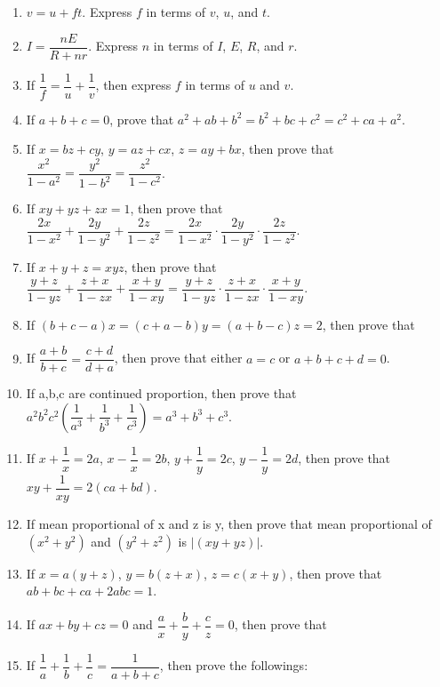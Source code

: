 \begin{enumerate}
            \item $v=u+ft$. Express $f$ in terms of $v$, $u$, and $t$.
            \item $I=\dfrac{nE}{R+nr}$. Express $n$ in terms of $I$, $E$, $R$, and $r$.
            \item If $\dfrac{1}{f}=\dfrac{1}{u}+\dfrac{1}{v}$, then express $f$ in terms of $u$ and $v$.



            \item If $a+b+c=0$, prove that $a^2+ab+b^2=b^2+bc+c^2=c^2+ca+a^2$.
            \item If $x=bz+cy$, $y=az+cx$, $z=ay+bx$, then prove that $\dfrac{x^2}{1-a^2}=\dfrac{y^2}{1-b^2}=\dfrac{z^2}{1-c^2}$.
            \item If $xy+yz+zx=1$, then prove that $\dfrac{2x}{1-x^2}+\dfrac{2y}{1-y^2}+\dfrac{2z}{1-z^2}=\dfrac{2x}{1-x^2}\cdot\dfrac{2y}{1-y^2}\cdot\dfrac{2z}{1-z^2}$.
            \item If $x+y+z=xyz$, then prove that $\dfrac{y+z}{1-yz}+\dfrac{z+x}{1-zx}+\dfrac{x+y}{1-xy}=\dfrac{y+z}{1-yz}\cdot\dfrac{z+x}{1-zx}\cdot\dfrac{x+y}{1-xy}$.
            \item If $(b+c-a)x=(c+a-b)y=(a+b-c)z=2$, then prove that 
            \item If $\dfrac{a+b}{b+c}=\dfrac{c+d}{d+a}$, then prove that either $a=c$ or $a+b+c+d=0$.
            \item If a,b,c are continued proportion, then prove that $a^2b^2c^2\left(\dfrac{1}{a^3}+\dfrac{1}{b^3}+\dfrac{1}{c^3}\right)=a^3+b^3+c^3$.
            \item If $x+\dfrac{1}{x}=2a$, $x-\dfrac{1}{x}=2b$, $y+\dfrac{1}{y}=2c$, $y-\dfrac{1}{y}=2d$, then prove that $xy+\dfrac{1}{xy}=2(ca+bd)$.
            \item If mean proportional of x and z is y, then prove that mean proportional of $(x^2+y^2)$ and $(y^2+z^2)$ is $\left|(xy+yz)\right|$.
            \item If $x=a(y+z)$, $y=b(z+x)$, $z=c(x+y)$, then prove that $ab+bc+ca+2abc=1$.
            \item If $ax+by+cz=0$ and $\dfrac{a}{x}+\dfrac{b}{y}+\dfrac{c}{z}=0$, then prove that 
            \item If $\dfrac{1}{a}+\dfrac{1}{b}+\dfrac{1}{c}=\dfrac{1}{a+b+c}$, then prove the followings:

\end{enumerate}
